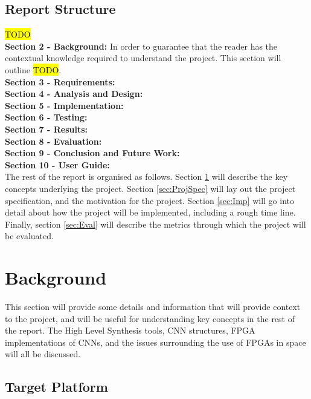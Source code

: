 \documentclass[12pt]{article}
\begin{document}
\vspace{-12pt}
\subsection{Report Structure}
\label{sec:Intro-Structure}
\vspace{-12pt}

\hl{TODO}\\
\textbf{Section 2 - Background:} In order to guarantee that the reader has the contextual knowledge required to understand the project. This section will outline \hl{TODO}.\\
\textbf{Section 3 - Requirements:}\\
\textbf{Section 4 - Analysis and Design:}\\
\textbf{Section 5 - Implementation:}\\
\textbf{Section 6 - Testing:}\\
\textbf{Section 7 - Results:}\\
\textbf{Section 8 - Evaluation:}\\
\textbf{Section 9 - Conclusion and Future Work:}\\
\textbf{Section 10 - User Guide:}\\

The rest of the report is organised as follows. Section \ref{sec:Background} will describe the key concepts underlying the project. Section \ref{sec:ProjSpec} will lay out the project specification, and the motivation for the project. Section \ref{sec:Imp} will go into detail about how the project will be implemented, including a rough time line. Finally, section \ref{sec:Eval} will describe the metrics through which the project will be evaluated.

\newpage

\section{Background}
\label{sec:Background}
\vspace{-12pt}

This section will provide some details and information that will provide context to the project, and will be useful for understanding key concepts in the rest of the report. The High Level Synthesis tools, CNN structures, FPGA implementations of CNNs, and the issues surrounding the use of FPGAs in space will all be discussed.

\subsection{Target Platform}
\label{sec:Background-TargetPlatform}
\vspace{-12pt}
\end{document}
